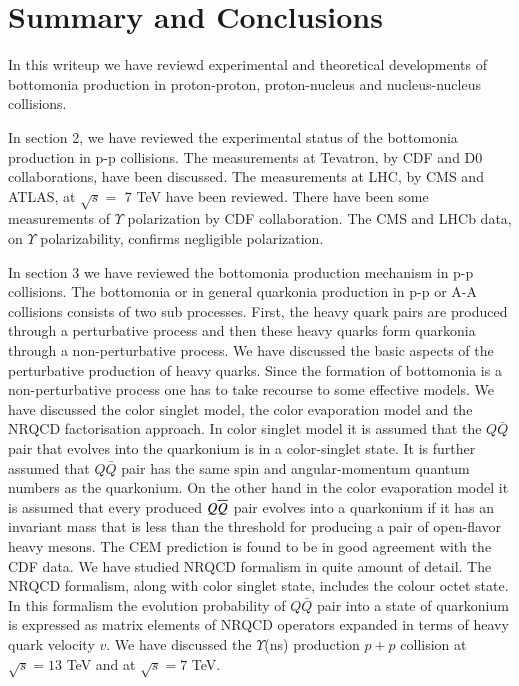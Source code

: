 \section{Summary and Conclusions}
\label{sec:conclusions}
In this writeup we have reviewd experimental and theoretical developments of
bottomonia production in proton-proton, proton-nucleus and nucleus-nucleus collisions.

In section 2, we have reviewed the experimental status of the bottomonia production in p-p collisions. The 
measurements at Tevatron, by CDF and D0 collaborations, have been discussed. The measurements at 
LHC, by CMS and ATLAS, at ${\sqrt s}=$ 7 TeV have been reviewed. There have been some measurements 
of $\Upsilon$ polarization by CDF collaboration.
The CMS and LHCb data, on $\Upsilon$ polarizability, confirms 
negligible polarization. 

In section 3 we have reviewed the bottomonia production mechanism in p-p 
collisions. The bottomonia or in general quarkonia production in p-p or A-A collisions consists of two 
sub processes. First, the heavy quark pairs are produced through a perturbative process and then 
these heavy quarks form quarkonia through a non-perturbative process. We have discussed the basic 
aspects of the perturbative production of heavy quarks. Since the formation of bottomonia 
is a non-perturbative process one has to take recourse to some effective models. We have discussed the 
color singlet model, the color evaporation model and the NRQCD factorisation approach. In color singlet  
model  it is assumed that the $Q\bar Q$ pair that evolves into
the quarkonium is in a color-singlet state. It is further assumed  that  $Q\bar Q$ pair   has the same spin
and angular-momentum quantum numbers as the quarkonium. On the other hand in the color evaporation 
model   it
is assumed that every produced $Q \overline{Q}$ pair evolves into a quarkonium
if it has an invariant mass that is less than the threshold for
producing a pair of open-flavor heavy mesons. The CEM prediction is found to be in good agreement 
with the CDF data. We have studied NRQCD formalism in quite amount of detail. The NRQCD formalism, 
along with color singlet state, includes the colour octet state. In this formalism the evolution probability of $Q\bar{Q}$
pair into a state of quarkonium is expressed as matrix elements of NRQCD operators expanded
in terms of heavy quark velocity $v$. We have discussed the $\Upsilon$(ns) production $p+p$ collision 
at $\sqrt s = 13$ TeV and at $\sqrt s =7$ TeV.

